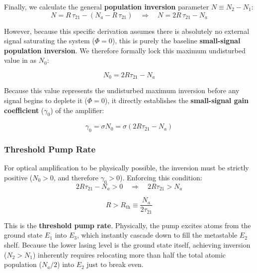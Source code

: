 Finally, we calculate the general \textbf{population inversion} parameter $N \equiv N_2 - N_1$:
\begin{equation*}
    N = R\,\tau_{21} - (N_a - R\,\tau_{21}) \quad \Longrightarrow \quad N = 2R\,\tau_{21} - N_a
\end{equation*}

However, because this specific derivation assumes there is absolutely no external signal saturating the system ($\Phi = 0$), this is purely the baseline \textbf{small-signal population inversion}. We therefore formally lock this maximum undisturbed value in as $N_0$:
\begin{keyresult}
    \begin{equation}
        N_0 = 2R\tau_{21} - N_a
    \end{equation}
\end{keyresult}

Because this value represents the undisturbed maximum inversion before any signal begins to deplete it ($\Phi = 0$), it directly establishes the \textbf{small-signal gain coefficient} ($\gamma_0$) of the amplifier:
\begin{keyresult}
    \begin{equation}
        \gamma_0 = \sigma N_0 = \sigma(2R\tau_{21} - N_a)
    \end{equation}
\end{keyresult}

\subsubsection*{Threshold Pump Rate}

For optical amplification to be physically possible, the inversion must be strictly positive ($N_0 > 0$, and therefore $\gamma_0 > 0$). Enforcing this condition:
\begin{equation*}
    2R\tau_{21} - N_a > 0 \quad \Longrightarrow \quad 2R\tau_{21} > N_a
\end{equation*}

\begin{keyresult}
    \begin{equation}
        R > R_\text{th} \equiv \frac{N_a}{2\tau_{21}}
    \end{equation}
\end{keyresult}

This is the \textbf{threshold pump rate}. Physically, the pump excites atoms from the ground state $E_1$ into $E_3$, which instantly cascade down to fill the metastable $E_2$ shelf. Because the lower lasing level is the ground state itself, achieving inversion ($N_2 > N_1$) inherently requires relocating more than half the total atomic population ($N_a/2$) into $E_2$ just to break even.


